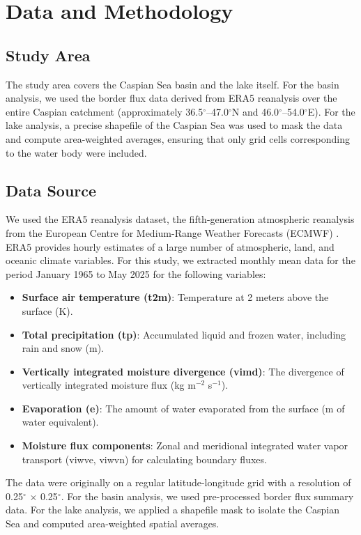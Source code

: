 \documentclass[12pt,a4paper]{article}
\begin{document}
\section{Data and Methodology}

\subsection{Study Area}
The study area covers the Caspian Sea basin and the lake itself. For the basin analysis, we used the border flux data derived from ERA5 reanalysis over the entire Caspian catchment (approximately 36.5$^\circ$–47.0$^\circ$N and 46.0$^\circ$–54.0$^\circ$E). For the lake analysis, a precise shapefile of the Caspian Sea was used to mask the data and compute area-weighted averages, ensuring that only grid cells corresponding to the water body were included.

\subsection{Data Source}
We used the ERA5 reanalysis dataset, the fifth-generation atmospheric reanalysis from the European Centre for Medium-Range Weather Forecasts (ECMWF) \citep{hersbach2020}. ERA5 provides hourly estimates of a large number of atmospheric, land, and oceanic climate variables. For this study, we extracted monthly mean data for the period January 1965 to May 2025 for the following variables:
\begin{itemize}
    \item \textbf{Surface air temperature (t2m)}: Temperature at 2 meters above the surface (K).
    \item \textbf{Total precipitation (tp)}: Accumulated liquid and frozen water, including rain and snow (m).
    \item \textbf{Vertically integrated moisture divergence (vimd)}: The divergence of vertically integrated moisture flux (kg m$^{-2}$ s$^{-1}$).
    \item \textbf{Evaporation (e)}: The amount of water evaporated from the surface (m of water equivalent).
    \item \textbf{Moisture flux components}: Zonal and meridional integrated water vapor transport (viwve, viwvn) for calculating boundary fluxes.
\end{itemize}
The data were originally on a regular latitude-longitude grid with a resolution of 0.25$^\circ$ $\times$ 0.25$^\circ$. For the basin analysis, we used pre-processed border flux summary data. For the lake analysis, we applied a shapefile mask to isolate the Caspian Sea and computed area-weighted spatial averages.
\end{document}
